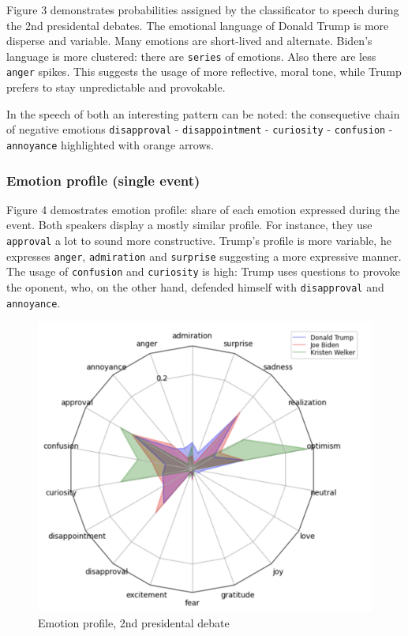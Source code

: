 \documentclass[pdflatex,sn-mathphys-num]{sn-jnl}%
\begin{document}
Figure 3 demonstrates probabilities assigned by the classificator to speech during the 2nd presidental debates.
The emotional language of Donald Trump is more disperse and variable. Many emotions are short-lived and alternate.
Biden's language is more clustered: there are \texttt{series} of emotions. Also there are less \texttt{anger} spikes. This suggests the usage of more reflective, moral tone, while Trump prefers to stay unpredictable and provokable.

In the speech of both an interesting pattern can be noted: the consequetive chain of negative emotions \texttt{disapproval} - \texttt{disappointment} - \texttt{curiosity} - \texttt{confusion} - \texttt{annoyance} highlighted with orange arrows.

\subsubsection{Emotion profile (single event)}

Figure 4 demostrates emotion profile: share of each emotion expressed during the event.
Both speakers display a mostly similar profile. For instance, they use \texttt{approval} a lot to sound more constructive.
Trump's profile is more variable, he expresses \texttt{anger}, \texttt{admiration} and \texttt{surprise} suggesting a more expressive manner. The usage of \texttt{confusion} and \texttt{curiosity} is high: Trump uses questions to provoke the oponent, who, on the other hand, defended himself with \texttt{disapproval} and \texttt{annoyance}. 

\begin{figure}[h]
	\centering
	\includegraphics[width=14cm]{f4-emotion_profile.png}
	\caption{Emotion profile, 2nd presidental debate}
\end{figure}
\end{document}
